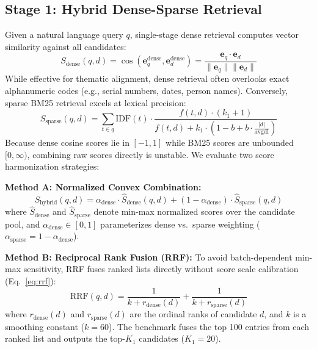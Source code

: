 \documentclass[conference]{IEEEtran}
\begin{document}
\subsection{Stage 1: Hybrid Dense-Sparse Retrieval}
Given a natural language query $q$, single-stage dense retrieval computes vector similarity against all candidates:
\begin{equation}
    S_{\text{dense}}(q, d) = \cos(\mathbf{e}_q^{\text{dense}}, \mathbf{e}_d^{\text{dense}}) = \frac{\mathbf{e}_q \cdot \mathbf{e}_d}{\|\mathbf{e}_q\| \|\mathbf{e}_d\|}
\end{equation}
While effective for thematic alignment, dense retrieval often overlooks exact alphanumeric codes (e.g., serial numbers, dates, person names). Conversely, sparse BM25 retrieval excels at lexical precision:
\begin{equation}
    S_{\text{sparse}}(q, d) = \sum_{t \in q} \text{IDF}(t) \cdot \frac{f(t, d) \cdot (k_1 + 1)}{f(t, d) + k_1 \cdot \left(1 - b + b \cdot \frac{|d|}{\text{avgdl}}\right)}
\end{equation}
Because dense cosine scores lie in $[-1, 1]$ while BM25 scores are unbounded $[0, \infty)$, combining raw scores directly is unstable. We evaluate two score harmonization strategies:

\textbf{Method A: Normalized Convex Combination:}
\begin{equation}
    S_{\text{hybrid}}(q, d) = \alpha_{\text{dense}} \cdot \hat{S}_{\text{dense}}(q, d) + (1 - \alpha_{\text{dense}}) \cdot \hat{S}_{\text{sparse}}(q, d)
    \label{eq:hybrid}
\end{equation}
where $\hat{S}_{\text{dense}}$ and $\hat{S}_{\text{sparse}}$ denote min-max normalized scores over the candidate pool, and $\alpha_{\text{dense}} \in [0, 1]$ parameterizes dense vs.\ sparse weighting ($\alpha_{\text{sparse}} = 1 - \alpha_{\text{dense}}$).

\textbf{Method B: Reciprocal Rank Fusion (RRF):}
To avoid batch-dependent min-max sensitivity, RRF \cite{cormack2009rrf} fuses ranked lists directly without score scale calibration (Eq.~\ref{eq:rrf}):
\begin{equation}
    \text{RRF}(q, d) = \frac{1}{k + r_{\text{dense}}(d)} + \frac{1}{k + r_{\text{sparse}}(d)}
    \label{eq:rrf}
\end{equation}
where $r_{\text{dense}}(d)$ and $r_{\text{sparse}}(d)$ are the ordinal ranks of candidate $d$, and $k$ is a smoothing constant ($k = 60$). The benchmark fuses the top 100 entries from each ranked list and outputs the top-$K_1$ candidates ($K_1 = 20$).
\end{document}

